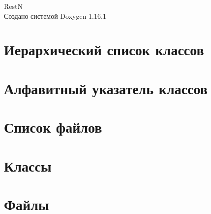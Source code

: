 \documentclass[twoside]{book}
\newcommand{\+}{\discretionary{\mbox{\scriptsize$\hookleftarrow$}}{}{}}
\newcommand{\clearemptydoublepage}{%
    \newpage{\pagestyle{empty}\cleardoublepage}%
  }
\begin{document}
  \raggedbottom
    \hypersetup{pageanchor=false,
                bookmarksnumbered=true,
                pdfencoding=unicode
               }
  \begin{titlepage}
  \vspace*{7cm}
  \begin{center}%
  {\Large RestN}\\
  \vspace*{1cm}
  {\large Создано системой Doxygen 1.16.1}\\
  \end{center}
  \end{titlepage}
  \clearemptydoublepage
  \tableofcontents
  \clearemptydoublepage
  \hypersetup{pageanchor=true}

\chapter{Иерархический список классов}

\chapter{Алфавитный указатель классов}

\chapter{Список файлов}

\chapter{Классы}











\chapter{Файлы}













  \backmatter
  \newpage
  \clearemptydoublepage
  \printindex
\end{document}
